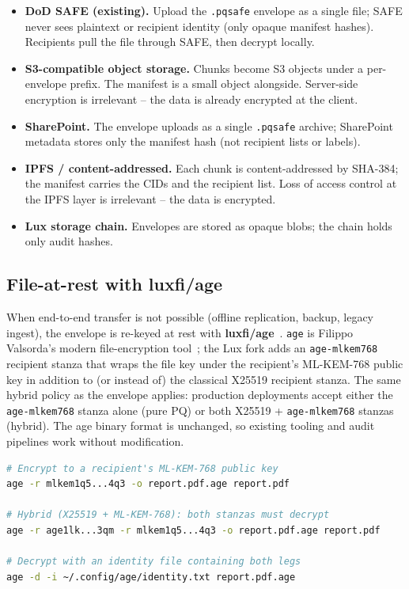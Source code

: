 \documentclass[11pt,a4paper]{article}
\begin{document}
\begin{itemize}[leftmargin=*,itemsep=0pt]
\item \textbf{DoD SAFE (existing).} Upload the \texttt{.pqsafe}
  envelope as a single file; SAFE never sees plaintext or recipient
  identity (only opaque manifest hashes). Recipients pull the file
  through SAFE, then decrypt locally.
\item \textbf{S3-compatible object storage.} Chunks become S3 objects
  under a per-envelope prefix. The manifest is a small object alongside.
  Server-side encryption is irrelevant -- the data is already encrypted
  at the client.
\item \textbf{SharePoint.} The envelope uploads as a single
  \texttt{.pqsafe} archive; SharePoint metadata stores only the
  manifest hash (not recipient lists or labels).
\item \textbf{IPFS / content-addressed.} Each chunk is content-addressed
  by SHA-384; the manifest carries the CIDs and the recipient list.
  Loss of access control at the IPFS layer is irrelevant -- the data is
  encrypted.
\item \textbf{Lux storage chain.} Envelopes are stored as opaque blobs;
  the chain holds only audit hashes.
\end{itemize}

\subsection{File-at-rest with luxfi/age}
\label{sec:age}

When end-to-end transfer is not possible (offline replication, backup,
legacy ingest), the envelope is re-keyed at rest with
\textbf{luxfi/age}~\cite{luxage}. \texttt{age} is Filippo Valsorda's
modern file-encryption tool~\cite{age}; the Lux fork adds an
\texttt{age-mlkem768} recipient stanza that wraps the file key under
the recipient's ML-KEM-768 public key in addition to (or instead of)
the classical X25519 recipient stanza. The same hybrid policy as the
envelope applies: production deployments accept either the
\texttt{age-mlkem768} stanza alone (pure PQ) or both X25519 +
\texttt{age-mlkem768} stanzas (hybrid). The age binary format is
unchanged, so existing tooling and audit pipelines work without
modification.

\begin{lstlisting}[language=bash,caption={luxfi/age usage examples.}]
# Encrypt to a recipient's ML-KEM-768 public key
age -r mlkem1q5...4q3 -o report.pdf.age report.pdf

# Hybrid (X25519 + ML-KEM-768): both stanzas must decrypt
age -r age1lk...3qm -r mlkem1q5...4q3 -o report.pdf.age report.pdf

# Decrypt with an identity file containing both legs
age -d -i ~/.config/age/identity.txt report.pdf.age
\end{lstlisting}
\end{document}
